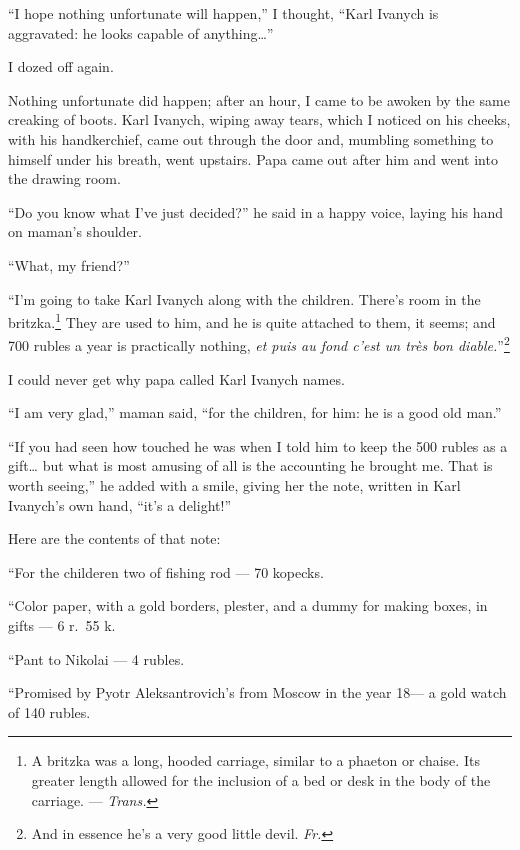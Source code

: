 ``I hope nothing unfortunate will happen,'' I thought, ``Karl Ivanych is aggravated: he looks capable of anything\ldots{}'' %

I dozed off again.

Nothing unfortunate did happen; after an hour, I came to be awoken by the same creaking of boots.  Karl Ivanych, wiping away tears, which I noticed on his cheeks, with his handkerchief, came out through the door and, mumbling something to himself under his breath, went upstairs. Papa came out after him and went into the drawing room.

``Do you know what I've just decided?'' he said in a happy voice, laying his hand on maman's shoulder. %

``What, my friend?'' %

``I'm going to take Karl Ivanych along with the children. There's room in the britzka.\footnote{A britzka was a long, hooded carriage, similar to a phaeton or chaise. Its greater length allowed for the inclusion of a bed or desk in the body of the carriage. --- \textit{Trans.}} They are used to him, and he is quite attached to them, it seems; and 700 rubles a year is practically nothing, \textit{et puis au fond c'est un tr\`es bon diable.}''\footnote{And in essence he's a very good little devil. \textit{Fr.}} %

I could never get why papa called Karl Ivanych names.

``I am very glad,'' maman said, ``for the children, for him: he is a good old man.'' %

``If you had seen how touched he was when I told him to keep the 500 rubles as a gift\ldots{} but what is most amusing of all is the accounting he brought me. That is worth seeing,'' he added with a smile, giving her the note, written in Karl Ivanych's own hand, ``it's a delight!'' %

Here are the contents of that note:

``For the childeren two of fishing rod --- 70 kopecks.

``Color paper, with a gold borders, plester, and a dummy for making boxes, in gifts --- 6 r.~55 k.

``Pant to Nikolai --- 4 rubles.

``Promised by Pyotr Aleksantrovich's from Moscow in the year 18--- a gold watch of 140 rubles.

